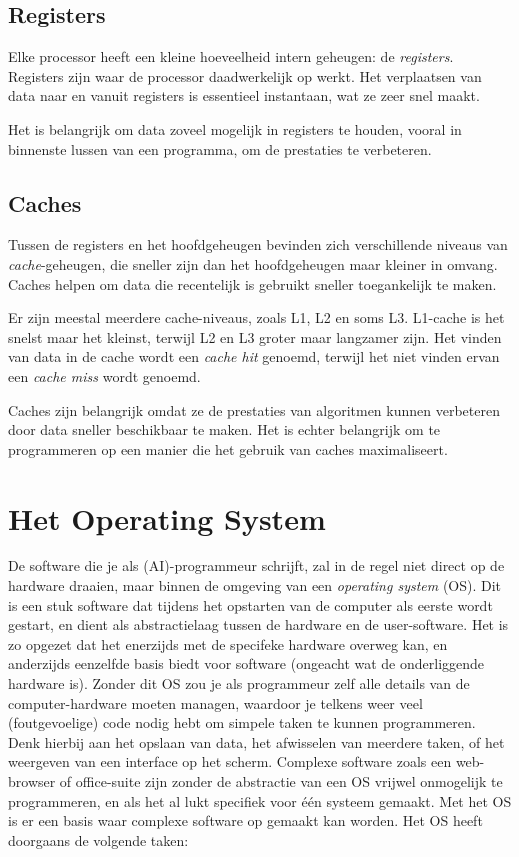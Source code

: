 \subsection{Registers}\label{sec:register }
Elke processor heeft een kleine hoeveelheid intern geheugen: de \textit{registers}. Registers zijn waar de processor daadwerkelijk op werkt. Het verplaatsen van data naar en vanuit registers is essentieel instantaan, wat ze zeer snel maakt.

Het is belangrijk om data zoveel mogelijk in registers te houden, vooral in binnenste lussen van een programma, om de prestaties te verbeteren.

\subsection{Caches}\label{sec:cache }
Tussen de registers en het hoofdgeheugen bevinden zich verschillende niveaus van \textit{cache}-geheugen, die sneller zijn dan het hoofdgeheugen maar kleiner in omvang. Caches helpen om data die recentelijk is gebruikt sneller toegankelijk te maken.

Er zijn meestal meerdere cache-niveaus, zoals L1, L2 en soms L3. L1-cache is het snelst maar het kleinst, terwijl L2 en L3 groter maar langzamer zijn. Het vinden van data in de cache wordt een \textit{cache hit} genoemd, terwijl het niet vinden ervan een \textit{cache miss} wordt genoemd.

Caches zijn belangrijk omdat ze de prestaties van algoritmen kunnen verbeteren door data sneller beschikbaar te maken. Het is echter belangrijk om te programmeren op een manier die het gebruik van caches maximaliseert.


\section{Het Operating System}\label{sec:os}

De software die je als (AI)-programmeur schrijft, zal in de regel niet direct op de hardware draaien, maar binnen de omgeving van een \emph{operating system} (OS). Dit is een stuk software dat tijdens het opstarten van de computer als eerste wordt gestart, en dient als abstractielaag tussen de hardware en de user-software. Het is zo opgezet dat het enerzijds met de specifeke hardware overweg kan, en anderzijds eenzelfde basis biedt voor software (ongeacht wat de onderliggende hardware is). Zonder dit OS zou je als programmeur zelf alle details van de computer-hardware moeten managen, waardoor je telkens weer veel (foutgevoelige) code nodig hebt om simpele taken te kunnen programmeren. Denk hierbij aan het opslaan van data, het afwisselen van meerdere taken, of het weergeven van een interface op het scherm. Complexe software zoals een web-browser of office-suite zijn zonder de abstractie van een OS vrijwel onmogelijk te programmeren, en als het al lukt specifiek voor één systeem gemaakt. Met het OS is er een basis waar complexe software op gemaakt kan worden. Het OS heeft doorgaans de volgende taken:

